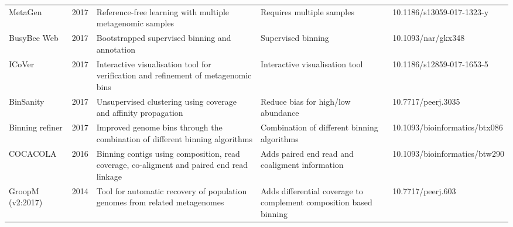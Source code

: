 \begin{tabular}{p{2cm}|p{0.6cm}|p{4cm}|p{4cm}|p{3.4cm}}
               MetaGen \cite{Xing2017MetaGen} &  2017 &                                 Reference-free learning with multiple metagenomic samples &                                                       Requires multiple samples &      10.1186/s13059-017-1323-y \\
         BusyBee Web \cite{Laczny2017BusyBee} &  2017 &                                            Bootstrapped supervised binning and annotation &                                                              Supervised binning &             10.1093/nar/gkx348 \\
            ICoVer \cite{Broeksema2017IcoVer} &  2017 &        Interactive visualisation tool for verification and refinement of metagenomic bins &                                                  Interactive visualisation tool &      10.1186/s12859-017-1653-5 \\
         BinSanity \cite{Graham2017Binsanity} &  2017 &                           Unsupervised clustering using coverage and affinity propagation &                                             Reduce bias for high/low abundance  &             10.7717/peerj.3035 \\
Binning refiner \cite{Song2017Binningrefiner} &  2017 &              Improved genome bins through the combination of different binning algorithms &                                     Combination of different binning algorithms &  10.1093/bioinformatics/btx086 \\
               COCACOLA \cite{Lu2016COCACOLA} &  2016 & Binning contigs using composition, read coverage, co-aligment and paired end read linkage &                                 Adds paired end read and coaligment information &  10.1093/bioinformatics/btw290 \\
   GroopM (v2:2017) \cite{Imelfort2014GroopM} &  2014 &                Tool for automatic recovery of population genomes from related metagenomes &              Adds differential coverage to complement composition based binning &              10.7717/peerj.603 \\
\bottomrule
\end{tabular}
